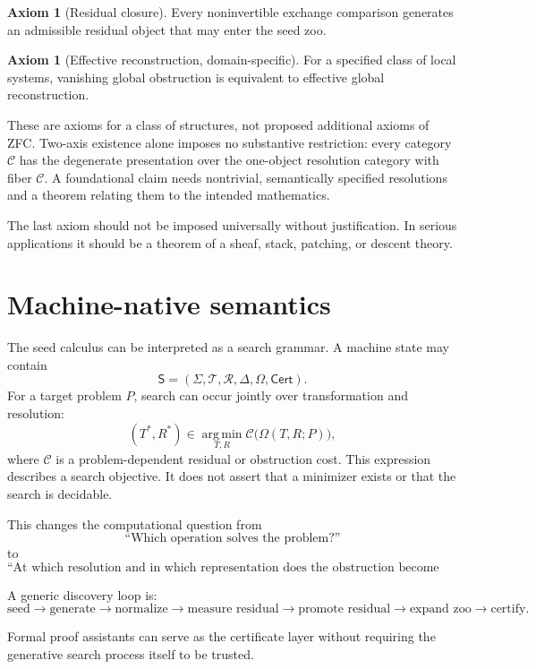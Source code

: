 \documentclass[11pt]{article}
\theoremstyle{definition}
\newtheorem{axiom}[theorem]{Axiom}
\theoremstyle{remark}
\newcommand{\Seeds}{\Sigma}
\begin{document}
\begin{axiom}[Residual closure]
Every noninvertible exchange comparison generates an admissible residual object that may enter the seed zoo.
\end{axiom}

\begin{axiom}[Effective reconstruction, domain-specific]
For a specified class of local systems, vanishing global obstruction is equivalent to effective global reconstruction.
\end{axiom}

These are axioms for a class of structures, not proposed additional axioms of ZFC. Two-axis existence alone imposes no substantive restriction: every category $\mathcal C$ has the degenerate presentation over the one-object resolution category with fiber $\mathcal C$. A foundational claim needs nontrivial, semantically specified resolutions and a theorem relating them to the intended mathematics.

The last axiom should not be imposed universally without justification. In serious applications it should be a theorem of a sheaf, stack, patching, or descent theory.

\section{Machine-native semantics}

The seed calculus can be interpreted as a search grammar. A machine state may contain
\[
\mathsf S=
(\Seeds,\mathscr T,\mathscr R,\Delta,\Omega,\mathsf{Cert}).
\]
For a target problem $P$, search can occur jointly over transformation and resolution:
\[
(T^\ast,R^\ast)
\in
\operatorname*{arg\,min}_{T,R}
\mathcal C\bigl(\Omega(T,R;P)\bigr),
\]
where $\mathcal C$ is a problem-dependent residual or obstruction cost. This expression describes a search objective. It does not assert that a minimizer exists or that the search is decidable.

This changes the computational question from
\[
\text{``Which operation solves the problem?''}
\]
to
\[
\boxed{
\text{``At which resolution and in which representation does the obstruction become simplest?''}
}
\]

A generic discovery loop is:
\[
\boxed{
\text{seed}
\to
\text{generate}
\to
\text{normalize}
\to
\text{measure residual}
\to
\text{promote residual}
\to
\text{expand zoo}
\to
\text{certify}.
}
\]

Formal proof assistants can serve as the certificate layer without requiring the generative search process itself to be trusted.
\end{document}
